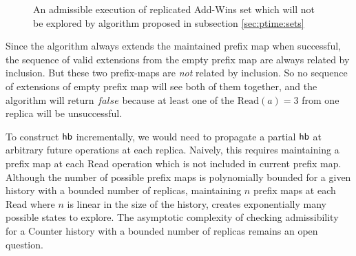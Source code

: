 \begin{figure}
\begin{minipage}{\textwidth}
      \caption{An admissible execution of replicated Add-Wins set which will not be explored by algorithm proposed in subsection \ref{sec:ptime:sets}}
      \label{correction:fig2}
  \end{minipage}
  \end{figure}

Since the algorithm always extends the maintained prefix map \ie when successful, the sequence of valid extensions from the empty prefix map are always related by inclusion. But these two prefix-maps are  \emph{not} related by inclusion. So no sequence of extensions of empty prefix map will see both of them together, and the algorithm will return $\mathit{false}$ because at least one of the $\mathrm{Read}(a) = 3$ from one replica will be unsuccessful. 

To construct $\textsf{hb}$ incrementally, we would need to propagate a partial $\textsf{hb}$ at arbitrary future operations at each replica. Naively, this requires maintaining a prefix map at each \textrm{Read} operation which is not included in current prefix map. Although the number of possible prefix maps is polynomially bounded for a given history with a bounded number of replicas, maintaining $n$ prefix maps at each \textrm{Read} where $n$ is linear in the size of the history, creates exponentially many possible states to explore. The asymptotic complexity of checking admissibility for a Counter history with a bounded number of replicas remains an open question.

